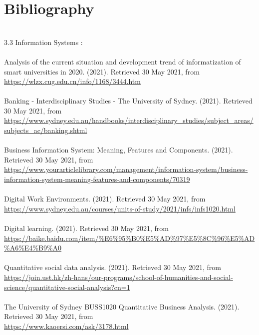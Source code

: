 \documentclass{article}
\begin{document}
	    
	\section{Bibliography}
	\\
	3.3 Information Systems : \\
	\\
	Analysis of the current situation and development trend of informatization of smart universities in 2020. (2021). Retrieved 30 May 2021, from \\
	\url{https://wlzx.cug.edu.cn/info/1168/3444.htm }\\
	\\
	Banking - Interdisciplinary Studies - The University of Sydney. (2021). Retrieved 30 May 2021, from \\
	\url{https://www.sydney.edu.au/handbooks/interdisciplinary_studies/subject_areas/subjects_ac/banking.shtml }\\
	\\
	Business Information System: Meaning, Features and Components. (2021). Retrieved 30 May 2021, from \\
	\url{https://www.yourarticlelibrary.com/management/information-system/business-information-system-meaning-features-and-components/70319 }\\
	\\
	Digital Work Environments. (2021). Retrieved 30 May 2021, from \\
	\url{ https://www.sydney.edu.au/courses/units-of-study/2021/infs/infs1020.html }\\
	\\
	Digital learning. (2021). Retrieved 30 May 2021, from\\
	\url{ https://baike.baidu.com/item/%E6%95%B0%E5%AD%97%E5%8C%96%E5%AD%A6%E4%B9%A0 } \\
	\\
	Quantitative social data analysis. (2021). Retrieved 30 May 2021, from \\
	\url{ https://join.ust.hk/zh-hans/our-programs/school-of-humanities-and-social-science/quantitative-social-analysis?cn=1 } \\
	\\
	The University of Sydney BUSS1020 Quantitative Business Analysis. (2021). Retrieved 30 May 2021, from \\
	\url{https://www.kaoersi.com/ask/3178.html }\\
	\\
	
\end{document}

